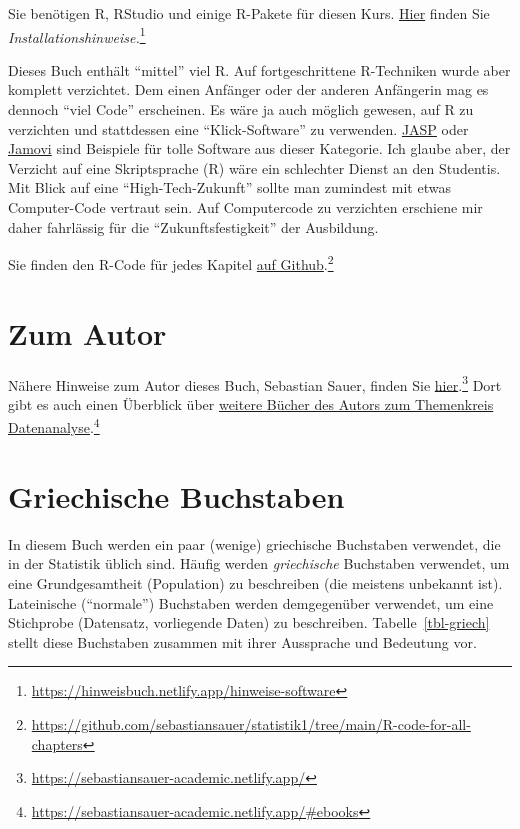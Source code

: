 \documentclass[
  letterpaper,
]{scrbook}
\theoremstyle{definition}
\theoremstyle{definition}
\theoremstyle{definition}
\theoremstyle{remark}
\begin{document}
Sie benötigen R, RStudio und einige R-Pakete für diesen Kurs.
\href{https://hinweisbuch.netlify.app/hinweise-software}{Hier} finden
Sie \emph{Installationshinweise.}\footnote{\url{https://hinweisbuch.netlify.app/hinweise-software}}

Dieses Buch enthält ``mittel'' viel R. Auf fortgeschrittene R-Techniken
wurde aber komplett verzichtet. Dem einen Anfänger oder der anderen
Anfängerin mag es dennoch ``viel Code'' erscheinen. Es wäre ja auch
möglich gewesen, auf R zu verzichten und stattdessen eine
``Klick-Software'' zu verwenden. \href{https://jasp-stats.org/}{JASP}
oder \href{https://www.jamovi.org/}{Jamovi} sind Beispiele für tolle
Software aus dieser Kategorie. Ich glaube aber, der Verzicht auf eine
Skriptsprache (R) wäre ein schlechter Dienst an den Studentis. Mit Blick
auf eine ``High-Tech-Zukunft'' sollte man zumindest mit etwas
Computer-Code vertraut sein. Auf Computercode zu verzichten erschiene
mir daher fahrlässig für die ``Zukunftsfestigkeit'' der Ausbildung.

Sie finden den R-Code für jedes Kapitel
\href{https://github.com/sebastiansauer/statistik1/tree/main/R-code-for-all-chapters}{auf
Github}.\footnote{\url{https://github.com/sebastiansauer/statistik1/tree/main/R-code-for-all-chapters}}

\section{Zum Autor}\label{zum-autor}

Nähere Hinweise zum Autor dieses Buch, Sebastian Sauer, finden Sie
\href{https://sebastiansauer-academic.netlify.app/}{hier}.\footnote{\url{https://sebastiansauer-academic.netlify.app/}}
Dort gibt es auch einen Überblick über
\href{https://sebastiansauer-academic.netlify.app/\#ebooks}{weitere
Bücher des Autors zum Themenkreis Datenanalyse}.\footnote{\url{https://sebastiansauer-academic.netlify.app/\#ebooks}}

\section{Griechische Buchstaben}\label{sec-greek}

In diesem Buch werden ein paar (wenige) griechische Buchstaben
verwendet, die in der Statistik üblich sind. Häufig werden
\emph{griechische} Buchstaben verwendet, um eine Grundgesamtheit
(Population) zu beschreiben (die meistens unbekannt ist). Lateinische
(``normale'') Buchstaben werden demgegenüber verwendet, um eine
Stichprobe (Datensatz, vorliegende Daten) zu beschreiben.
Tabelle~\ref{tbl-griech} stellt diese Buchstaben zusammen mit ihrer
Aussprache und Bedeutung vor.
\end{document}
